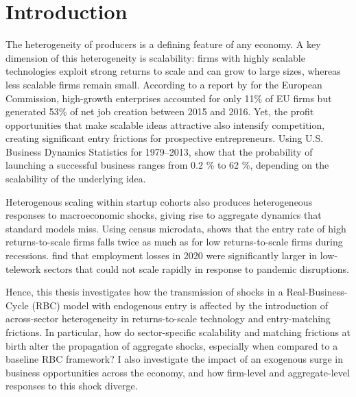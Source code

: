 \documentclass[a4paper,12pt]{article} %
\numberwithin{equation}{section} %
\numberwithin{figure}{section}
\numberwithin{table}{section}
\begin{document}
\newpage
{} %
\pagestyle{fancy}
\fancyhf{}
\fancyhead[C]{\leftmark}
\fancyfoot[C]{\thepage}

\thispagestyle{plain}
\section{Introduction}
\label{sec:introduction}

The heterogeneity of producers is a defining feature of any economy. A key dimension of this heterogeneity is 
scalability: firms with highly scalable technologies exploit strong returns to scale and can grow to large sizes, whereas less scalable 
firms remain small. According to a report by \textcite{flachenecker2020highgrowth} for the European Commission, high-growth enterprises 
accounted for only 11\% of EU firms but generated 53\% 
of net job creation between 2015 and 2016.
Yet, the profit opportunities that make scalable ideas attractive also intensify competition, creating significant entry frictions for 
prospective entrepreneurs. Using U.S. Business Dynamics Statistics for 1979–2013, \textcite{sedlavcek2017growth} show that the probability of launching a successful 
business ranges from 0.2 \% to 62 \%, depending on the scalability of the underlying idea.

Heterogenous scaling within startup cohorts also produces heterogeneous responses to macroeconomic shocks, giving rise to aggregate dynamics 
that standard models miss. Using census microdata, \textcite{smirnyagin2023returns} shows that the entry rate of high returns-to-scale firms falls 
twice as much as for low returns-to-scale firms during recessions. \textcite{calligaris2023employment} find that employment losses in 2020 were 
significantly larger in low-telework sectors that could not scale rapidly in response to pandemic disruptions.

Hence, this thesis investigates how the transmission of shocks in a Real-Business-Cycle (RBC) model with endogenous entry is affected by the introduction of across-sector 
heterogeneity in returns-to-scale technology and entry-matching frictions. In particular, how do sector-specific scalability and matching frictions at birth 
alter the propagation of aggregate shocks, especially when compared to a baseline RBC framework? I also investigate the impact of an exogenous 
surge in business opportunities across the economy, and how firm-level and aggregate-level responses to this shock diverge.
\end{document}
